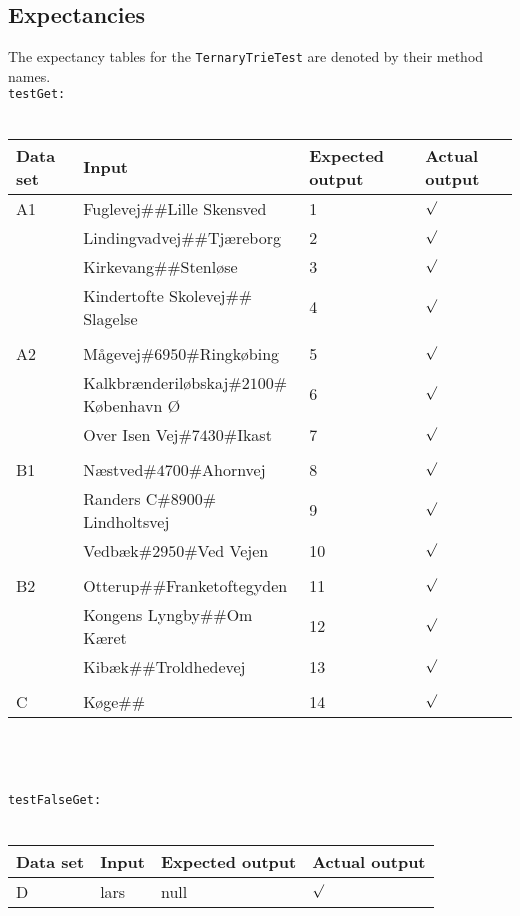 \pagebreak
\subsection{Expectancies}
The expectancy tables for the \texttt{TernaryTrieTest} are denoted by their method names.
\\
\texttt{testGet:}
\\
\\
\begin{tabular}{ p{1.5cm} | p{8cm} | p{2cm} | p{1cm} }
	\textbf{Data set} & \textbf{Input} & \textbf{Expected output} & \textbf{Actual output} \\	
	\hline
	A1 & Fuglevej$\#\#$Lille Skensved & 1 & $\surd$ \\
	& Lindingvadvej$\#\#$Tj\ae reborg & 2 & $\surd$ \\
	& Kirkevang$\#\#$Stenl\o se & 3 & $\surd$ \\
	& Kindertofte Skolevej$\#\#$Slagelse & 4 & $\surd$ \\
	&&&\\	
	A2 & M\aa gevej$\#6950\#$Ringk\o bing & 5 & $\surd$ \\
	& Kalkbr\ae nderil\o bskaj$\#2100\#$K\o benhavn \O  & 6 & $\surd$ \\
	& Over Isen Vej$\#7430\#$Ikast & 7 & $\surd$ \\
	&&&\\
	B1 & N\ae stved$\#4700\#$Ahornvej & 8 & $\surd$ \\
	& Randers C$\#8900\#$Lindholtsvej & 9 & $\surd$ \\
	& Vedb\ae k$\#2950\#$Ved Vejen & 10 & $\surd$ \\
	&&&\\
	B2 & Otterup$\#\#$Franketoftegyden & 11 & $\surd$ \\
	& Kongens Lyngby$\#\#$Om K\ae ret & 12 & $\surd$ \\
	& Kib\ae k$\#\#$Troldhedevej & 13 & $\surd$ \\
	&&&\\
	C & K\o ge$\#\#$ & 14 & $\surd$ \\
\end{tabular}
\\
\\
\\
\texttt{testFalseGet:}
\\
\\
\begin{tabular}{ p{1.5cm} | p{8cm} | p{2cm} | p{1cm} }
	\textbf{Data set} & \textbf{Input} & \textbf{Expected output} & \textbf{Actual output} \\	
	\hline
	D & lars & null & $\surd$
\end{tabular}
